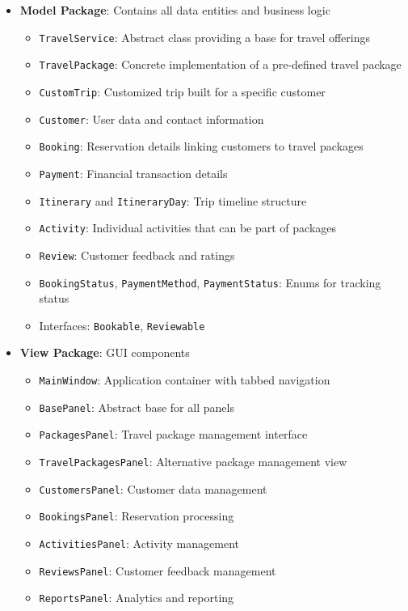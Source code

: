 \documentclass[12pt]{article}
\begin{document}
\begin{itemize}
    \item \textbf{Model Package}: Contains all data entities and business logic
    \begin{itemize}
        \item \texttt{TravelService}: Abstract class providing a base for travel offerings
        \item \texttt{TravelPackage}: Concrete implementation of a pre-defined travel package
        \item \texttt{CustomTrip}: Customized trip built for a specific customer
        \item \texttt{Customer}: User data and contact information
        \item \texttt{Booking}: Reservation details linking customers to travel packages
        \item \texttt{Payment}: Financial transaction details
        \item \texttt{Itinerary} and \texttt{ItineraryDay}: Trip timeline structure
        \item \texttt{Activity}: Individual activities that can be part of packages
        \item \texttt{Review}: Customer feedback and ratings
        \item \texttt{BookingStatus}, \texttt{PaymentMethod}, \texttt{PaymentStatus}: Enums for tracking status
        \item Interfaces: \texttt{Bookable}, \texttt{Reviewable}
    \end{itemize}
    
    \item \textbf{View Package}: GUI components
    \begin{itemize}
        \item \texttt{MainWindow}: Application container with tabbed navigation
        \item \texttt{BasePanel}: Abstract base for all panels
        \item \texttt{PackagesPanel}: Travel package management interface
        \item \texttt{TravelPackagesPanel}: Alternative package management view
        \item \texttt{CustomersPanel}: Customer data management
        \item \texttt{BookingsPanel}: Reservation processing
        \item \texttt{ActivitiesPanel}: Activity management
        \item \texttt{ReviewsPanel}: Customer feedback management
        \item \texttt{ReportsPanel}: Analytics and reporting
    \end{itemize}
    

\end{itemize}
\end{document}
